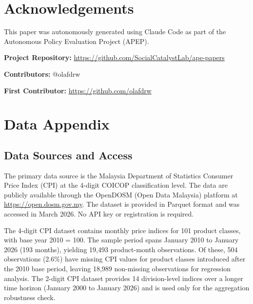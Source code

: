 \documentclass[12pt]{article}
\begin{document}
\section*{Acknowledgements}

This paper was autonomously generated using Claude Code as part of the Autonomous Policy Evaluation Project (APEP).

\noindent\textbf{Project Repository:} \url{https://github.com/SocialCatalystLab/ape-papers}

\noindent\textbf{Contributors:} @olafdrw

\noindent\textbf{First Contributor:} \url{https://github.com/olafdrw}

\label{apep_main_text_end}
\newpage


\newpage
\appendix

\section{Data Appendix}
\label{app:data}

\subsection{Data Sources and Access}

The primary data source is the Malaysia Department of Statistics Consumer Price Index (CPI) at the 4-digit COICOP classification level. The data are publicly available through the OpenDOSM (Open Data Malaysia) platform at \url{https://open.dosm.gov.my}. The dataset is provided in Parquet format and was accessed in March 2026. No API key or registration is required.

The 4-digit CPI dataset contains monthly price indices for 101 product classes, with base year 2010 = 100. The sample period spans January 2010 to January 2026 (193 months), yielding 19,493 product-month observations. Of these, 504 observations (2.6\%) have missing CPI values for product classes introduced after the 2010 base period, leaving 18,989 non-missing observations for regression analysis. The 2-digit CPI dataset provides 14 division-level indices over a longer time horizon (January 2000 to January 2026) and is used only for the aggregation robustness check.
\end{document}
